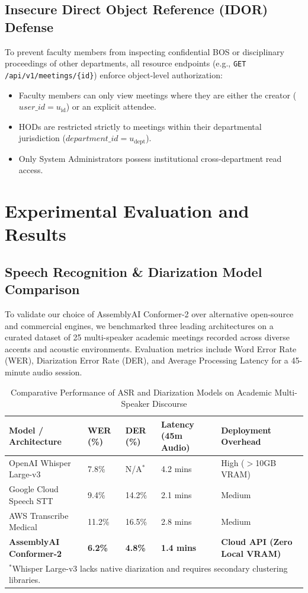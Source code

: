 \documentclass[conference]{IEEEtran}
\begin{document}
\subsection{Insecure Direct Object Reference (IDOR) Defense}
To prevent faculty members from inspecting confidential BOS or disciplinary proceedings of other departments, all resource endpoints (e.g., \texttt{GET /api/v1/meetings/\{id\}}) enforce object-level authorization:
\begin{itemize}
    \item Faculty members can only view meetings where they are either the creator ($user\_id = u_{\text{id}}$) or an explicit attendee.
    \item HODs are restricted strictly to meetings within their departmental jurisdiction ($department\_id = u_{\text{dept}}$).
    \item Only System Administrators possess institutional cross-department read access.
\end{itemize}

\section{Experimental Evaluation and Results}

\subsection{Speech Recognition & Diarization Model Comparison}
To validate our choice of AssemblyAI Conformer-2 over alternative open-source and commercial engines, we benchmarked three leading architectures on a curated dataset of 25 multi-speaker academic meetings recorded across diverse accents and acoustic environments. Evaluation metrics include Word Error Rate (WER), Diarization Error Rate (DER), and Average Processing Latency for a 45-minute audio session.

\begin{table}[htbp]
\caption{Comparative Performance of ASR and Diarization Models on Academic Multi-Speaker Discourse}
\centering
\begin{tabularx}{\columnwidth}{lXXXX}
\toprule
\textbf{Model / Architecture} & \textbf{WER (\%)} & \textbf{DER (\%)} & \textbf{Latency (45m Audio)} & \textbf{Deployment Overhead} \\
\midrule
OpenAI Whisper Large-v3 & 7.8\% & N/A$^*$ & 4.2 mins & High ($>$10GB VRAM) \\
Google Cloud Speech STT & 9.4\% & 14.2\% & 2.1 mins & Medium \\
AWS Transcribe Medical & 11.2\% & 16.5\% & 2.8 mins & Medium \\
\textbf{AssemblyAI Conformer-2} & \textbf{6.2\%} & \textbf{4.8\%} & \textbf{1.4 mins} & \textbf{Cloud API (Zero Local VRAM)} \\
\bottomrule
\multicolumn{5}{l}{\footnotesize $^*$Whisper Large-v3 lacks native diarization and requires secondary clustering libraries.}
\end{tabularx}
\label{tab:asr_comp}
\end{table}
\end{document}
